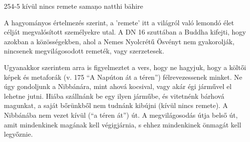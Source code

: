 
\begin{notesdescription}

\item[{254-5}
{kívül nincs remete}
{samaṇo natthi bāhire}] \hfill\par

A hagyományos értelmezés szerint, a 'remete' itt a világról való lemondó élet célját megvalósított személyekre utal. A DN 16 szuttában a Buddha kifejti, hogy azokban a közösségekben, ahol a Nemes Nyolcrétű Ösvényt nem gyakorolják, nincsenek megvilágosodott remeték, vagy szerzetesek.

Ugyanakkor szerintem arra is figyelmeztet a vers, hogy ne hagyjuk, hogy a költői képek és metaforák (v. 175 ``A Napúton át a téren'') félrevezessenek minket. Ne úgy gondoljunk a Nibbánára, mint ahová kocsival, vagy akár égi járművel el lehetne jutni. Hiába szállnánk be egy ilyen járműbe, és vitetnénk bárhová magunkat, a saját bőrünkből nem tudnánk kibújni (kívül nincs remete). A Nibbánába nem vezet kívül (``a téren át'') út. A megvilágosodás útja belső út, amit mindenkinek magának kell végigjárnia, s ehhez mindenkinek önmagát kell legyőznie.

\end{notesdescription}
